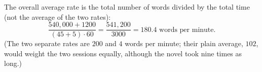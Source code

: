 The overall average rate is the total number of words divided by the total time (not the average of the two rates):
\[
\dfrac{540{,}000+1200}{(45+5)\cdot60}=\dfrac{541{,}200}{3000}=\boxed{180.4\text{ words per minute}}.
\]
(The two separate rates are $200$ and $4$ words per minute; their plain average, $102$, would weight the two sessions equally, although the novel took nine times as long.)
